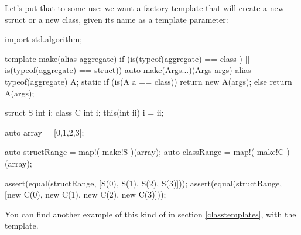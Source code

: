 Let's put that to some use: we want a factory template that will create a new struct or a new class, given its name as a template parameter:

\begin{dcode}
import std.algorithm;

template make(alias aggregate) 
    if (is(typeof(aggregate) == class ) 
     || is(typeof(aggregate) == struct))
{
    auto make(Args...)(Args args)
    {
        alias typeof(aggregate) A;        
        static if (is(A a == class))
            return new A(args);
        else
            return A(args);
    }
}

struct S {int i;}
class C {int i; this(int ii) { i = ii;}}

auto array = [0,1,2,3];

auto structRange = map!( make!S )(array);
auto classRange  = map!( make!C )(array);

assert(equal(structRange, [S(0), S(1), S(2), S(3)]));
assert(equal(structRange, [new C(0), new C(1), new C(2), new C(3)]));
\end{dcode}

You can find another example of this kind of  in section \ref{classtemplates}, with the  template.
